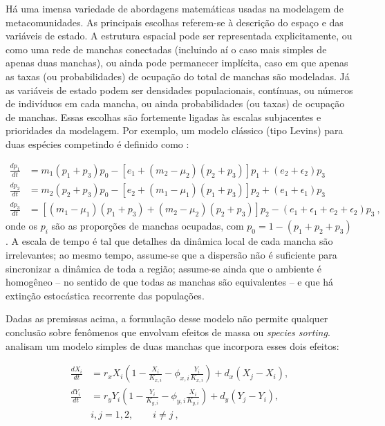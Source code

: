 \documentclass[12pt]{extarticle}
\begin{document}
Há uma imensa variedade de abordagens matemáticas usadas na modelagem de
metacomunidades. As principais escolhas referem-se à descrição do espaço e das
variáveis de estado. A estrutura espacial pode ser representada
explicitamente, ou como uma rede de manchas conectadas (incluindo aí o caso
mais simples de apenas duas manchas), ou ainda pode permanecer implícita, caso
em que apenas as taxas (ou probabilidades) de ocupação do total de manchas são
modeladas. Já as variáveis de estado podem ser densidades populacionais,
contínuas, ou números de indivíduos em cada mancha, ou ainda probabilidades
(ou taxas) de ocupação de manchas. 
Essas escolhas são fortemente ligadas às
escalas subjacentes e prioridades da modelagem. Por exemplo, um
modelo clássico (tipo Levins) para duas espécies competindo é definido como
\citep{slatkin1974}:

\begin{equation}
  \begin{aligned}
    \frac{dp_1}{dt} &= m_1 (p_1+p_3) p_0 - \left[ e_1 + (m_2-\mu_2)(p_2+p_3) \right] p_1 + (e_2+\epsilon_2)p_3\\
    \frac{dp_2}{dt} &= m_2 (p_2+p_3) p_0 - \left[ e_2 + (m_1-\mu_1)(p_1+p_3) \right] p_2 + (e_1+\epsilon_1)p_3\\
    \frac{dp_3}{dt} &= \left[ (m_1-\mu_1)(p_1+p_3) + (m_2-\mu_2)(p_2+p_3)\right] p_2 -
    (e_1+\epsilon_1+e_2+\epsilon_2)p_3~,
  \end{aligned}
\end{equation}
% 
onde os $p_i$ são as proporções de manchas ocupadas, com $p_0 =
1-(p_1+p_2+p_3)$. A escala de tempo é tal que detalhes da dinâmica local de cada mancha
são irrelevantes; ao mesmo tempo, assume-se que a dispersão não é suficiente para
sincronizar a dinâmica de toda a região; assume-se ainda que o ambiente é
homogêneo -- no sentido de que todas as manchas são equivalentes -- e que há
extinção estocástica recorrente das populações.

Dadas as premissas acima, a formulação desse modelo não permite
qualquer conclusão sobre fenômenos que envolvam efeitos de massa ou \emph{species sorting}. 
\citet{amarasekare2001} analisam um modelo simples de duas
manchas que incorpora esses dois efeitos:

\begin{equation}
    \begin{aligned}
        \frac{dX_i}{dt} &= r_x X_i \left( 1 - \frac{X_i}{K_{x,i}} - \phi_{x,i}
        \frac{Y_i}{K_{x,i}} \right) + d_x (X_j - X_i), \\
        \frac{dY_i}{dt} &= r_y Y_i \left( 1 - \frac{Y_i}{K_{y,i}} - \phi_{y,i}
        \frac{X_i}{K_{y,i}} \right) + d_y (Y_j - Y_i), \\
        & i, j = 1, 2, \qquad i \neq j~,
    \end{aligned}
\end{equation}
\end{document}
